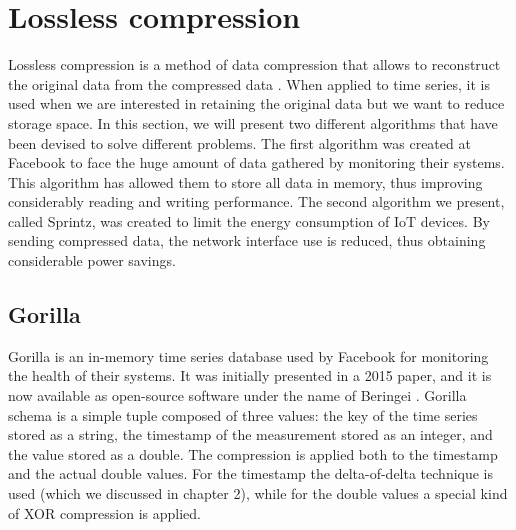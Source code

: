 \section{Lossless compression}
Lossless compression is a method of data compression that allows to reconstruct the original
data from the compressed data \cite{WikipediaContributors2019Data}. When applied to time series, it is used when we are
interested in retaining the original data but we want to reduce storage space. In this
section, we will present two different algorithms that have been devised to solve different
problems. The first algorithm was created at Facebook to face the huge amount of data
gathered by monitoring their systems. This algorithm has allowed them to store all data
in memory, thus improving considerably reading and writing performance.
The second algorithm we present, called Sprintz, was created to limit the energy consumption
of IoT devices. By sending compressed data, the network interface use is reduced, thus
obtaining considerable power savings.

\subsection{Gorilla}
Gorilla is an in-memory time series database used by Facebook for monitoring the health of
their systems. It was initially presented in a 2015 paper, and it is now available as
open-source software under the name of Beringei \cite{beringei}. Gorilla schema is a simple tuple
composed of three values: the key of the time series stored as a string, the timestamp of the
measurement stored as an integer, and the value stored as a double. 
The compression is applied both to the timestamp and the actual double values. For the
timestamp the delta-of-delta technique is used (which we discussed in chapter 2), while for
the double values a special kind of XOR compression is applied.

